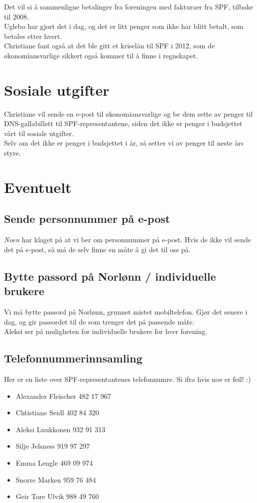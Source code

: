 \documentclass[12pt,norsk]{article}
\begin{document}
\noindent Det vil si å sammenligne betalinger fra foreningen med fakturaer fra SPF,
tilbake til 2008.\\

\noindent Uglebo har gjort det i dag, og det er litt penger som ikke har blitt betalt,
som betales etter hvert.\\

\noindent Christiane fant også at det ble gitt et kriselån til SPF i 2012,
som de økonomiansvarlige sikkert også kommer til å finne i regnskapet.

\section{Sosiale utgifter}
Christiane vil sende en e-post til økonomiansvarlige og be dem sette av penger
til DNS-gallabillett til SPF-representantene, 
siden det ikke er penger i budsjettet vårt til sosiale utgifter.\\

\noindent Selv om det ikke er penger i budsjettet i år, 
så setter vi av penger til neste års styre.

\section{Eventuelt}
\subsection{Sende personnummer på e-post}
\textit{Noen} har klaget på at vi ber om personnummer på e-post.
Hvis de ikke vil sende det på e-post, så må de selv finne en måte å gi det til oss på.\\

\subsection{Bytte passord på Norlønn / individuelle brukere}
Vi må bytte passord på Norlønn, grunnet mistet mobiltelefon. 
Gjør det senere i dag, og gir passordet til de som trenger det på passende måte.\\

\noindent Aleksi ser på muligheten for individuelle brukere for hver forening.

\subsection{Telefonnummerinnsamling}
Her er en liste over SPF-representantenes telefonnumre. Si ifra hvis noe er feil! :)
\begin{itemize}
	\item Alexander Fleischer 482 17 967
	\item Chtistiane Seidl 402 84 320
	\item Aleksi Luukkonen 932 91 313
	\item Silje Jelsness 919 97 297
	\item Emma Lengle 469 09 974
	\item Snorre Marken 959 76 484
	\item Geir Tore Ulvik 988 49 760
\end{itemize}
\end{document}

